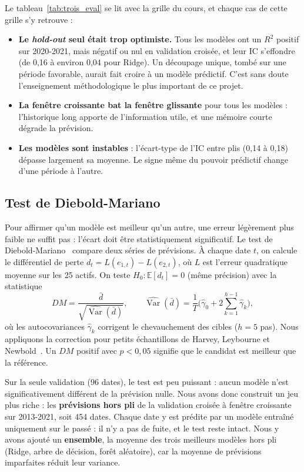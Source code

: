 Le tableau~\ref{tab:trois_eval} se lit avec la grille du cours, et chaque cas de cette grille s'y retrouve :
\begin{itemize}
  \item \textbf{Le \emph{hold-out} seul était trop optimiste.} Tous les modèles ont un $R^2$ positif sur 2020-2021, mais négatif ou nul en validation croisée, et leur IC s'effondre (de 0,16 à environ 0,04 pour Ridge). Un découpage unique, tombé sur une période favorable, aurait fait croire à un modèle prédictif. C'est sans doute l'enseignement méthodologique le plus important de ce projet.
  \item \textbf{La fenêtre croissante bat la fenêtre glissante} pour tous les modèles : l'historique long apporte de l'information utile, et une mémoire courte dégrade la prévision.
  \item \textbf{Les modèles sont instables} : l'écart-type de l'IC entre plis (0,14 à 0,18) dépasse largement sa moyenne. Le signe même du pouvoir prédictif change d'une période à l'autre.
\end{itemize}

\subsection{Test de Diebold-Mariano}

Pour affirmer qu'un modèle est meilleur qu'un autre, une erreur légèrement plus faible ne suffit pas : l'écart doit être statistiquement significatif. Le test de Diebold-Mariano~\cite{diebold1995} compare deux séries de prévisions. À chaque date $t$, on calcule le différentiel de perte $d_t = L(e_{1,t}) - L(e_{2,t})$, où $L$ est l'erreur quadratique moyenne sur les 25 actifs. On teste $H_0 : \mathbb{E}[d_t] = 0$ (même précision) avec la statistique
\begin{equation}
  DM = \frac{\bar d}{\sqrt{\widehat{\operatorname{Var}}(\bar d)}}, \qquad \widehat{\operatorname{Var}}(\bar d) = \frac{1}{T}\Big(\hat\gamma_0 + 2\sum_{k=1}^{h-1}\hat\gamma_k\Big),
\end{equation}
où les autocovariances $\hat\gamma_k$ corrigent le chevauchement des cibles ($h = 5$ pas). Nous appliquons la correction pour petits échantillons de Harvey, Leybourne et Newbold~\cite{harvey1997}. Un $DM$ positif avec $p < 0{,}05$ signifie que le candidat est meilleur que la référence.

Sur la seule validation (96 dates), le test est peu puissant : aucun modèle n'est significativement différent de la prévision nulle. Nous avons donc construit un jeu plus riche : les \textbf{prévisions hors pli} de la validation croisée à fenêtre croissante sur 2013-2021, soit 454 dates. Chaque date y est prédite par un modèle entraîné uniquement sur le passé : il n'y a pas de fuite, et le test reste intact. Nous y avons ajouté un \textbf{ensemble}, la moyenne des trois meilleurs modèles hors pli (Ridge, arbre de décision, forêt aléatoire), car la moyenne de prévisions imparfaites réduit leur variance.

